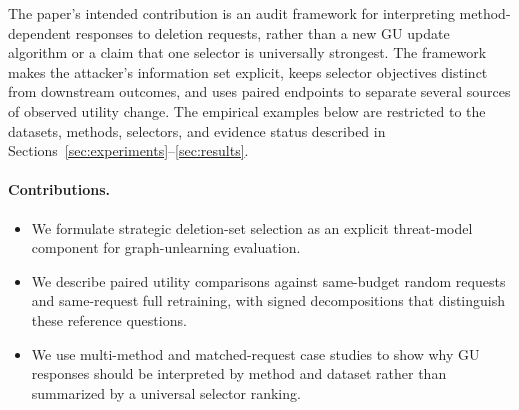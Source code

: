 The paper's intended contribution is an audit framework for interpreting method-dependent responses to deletion requests, rather than a new GU update algorithm or a claim that one selector is universally strongest. The framework makes the attacker's information set explicit, keeps selector objectives distinct from downstream outcomes, and uses paired endpoints to separate several sources of observed utility change. The empirical examples below are restricted to the datasets, methods, selectors, and evidence status described in Sections~\ref{sec:experiments}--\ref{sec:results}.

\paragraph{Contributions.}
\begin{itemize}
  \item We formulate strategic deletion-set selection as an explicit threat-model component for graph-unlearning evaluation.
  \item We describe paired utility comparisons against same-budget random requests and same-request full retraining, with signed decompositions that distinguish these reference questions.
  \item We use multi-method and matched-request case studies to show why GU responses should be interpreted by method and dataset rather than summarized by a universal selector ranking.
\end{itemize}
